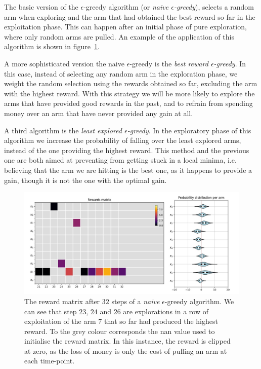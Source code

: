 \documentclass[]{scrartcl}
\theoremstyle{definition}
\begin{document}
The basic version of the $\epsilon$-greedy algorithm (or \emph{naive $\epsilon$-greedy}), selects a random arm when exploring and the arm that had obtained the best reward so far in the exploitation phase. This can happen after an initial phase of pure exploration, where only random arms are pulled. An example of the application of this algorithm is shown in figure~\ref{fig:step_32}.

A more sophisticated version the naive $\epsilon$-greedy is the \emph{best reward $\epsilon$-greedy}. In this case, instead of selecting any random arm in the exploration phase, we weight the random selection using the rewards obtained so far, excluding the arm with the highest reward. With this strategy we will be more likely to explore the arms that have provided good rewards in the past, and to refrain from spending money over an arm that have never provided any gain at all.

A third algorithm is the \emph{least explored $\epsilon$-greedy}. In the exploratory phase of this algorithm we increase the probability of falling over the least explored arms, instead of the one providing the highest reward. This method and the previous one are both aimed at preventing from getting stuck in a local minima, i.e. believing that the arm we are hitting is the best one, as it happens to provide a gain, though it is not the one with the optimal gain.

\begin{figure}[h]
    \hspace{-1cm}
    \includegraphics[width=17cm]{figures/step_32.jpg}
    \caption{The reward matrix after $32$ steps of a \emph{naive} $\epsilon$-greedy algorithm. We can see that step $23$, $24$ and $26$ are explorations in a row of exploitation of the arm $7$ that so far had produced the highest reward. To the grey colour corresponds the nan value used to initialise the reward matrix. In this instance, the reward is clipped at zero, as the loss of money is only the cost of pulling an arm at each time-point.}
    \label{fig:step_32}
\end{figure}
\end{document}
